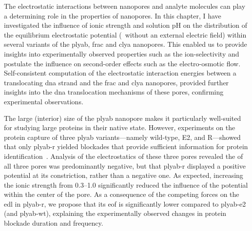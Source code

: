 The electrostatic interactions between nanopores and analyte molecules can play a determining role in the
properties of nanopores. In this chapter, I have investigated the influence of ionic strength and solution pH
on the distribution of the equilibrium electrostatic potential (\ie~without an external electric field) within
several variants of the \gls{plyab}, \gls{frac} and \gls{clya} nanopores. This enabled us to provide insights
into experimentally observed properties such as the ion-selectivity and postulate the influence on second-order
effects such as the electro-osmotic flow. Self-consistent computation of the electrostatic interaction
energies between a translocating \gls{dna} strand and the \gls{frac} and \gls{clya} nanopores, provided
further insights into the \gls{dna} translocation mechanisms of these pores, confirming experimental
observations.

The large (interior) size of the \gls{plyab} nanopore makes it particularly well-suited for studying large
proteins in their native state. However, experiments on the protein capture of three \gls{plyab}
variants---namely wild-type, E2, and R---showed that only \gls{plyab-r} yielded blockades that provide
sufficient information for protein identification~\cite{Huang-2020}. Analysis of the electrostatics of these
three pores revealed the \lumen{} of all three pores was predominantly negative, but that \gls{plyab-r}
displayed a positive potential at its constriction, rather than a negative one. As expected, increasing the
ionic strength from \SIrange{0.3}{1.0}{\Molar} significantly reduced the influence of the potential within the
center of the pore. As a consequence of the competing forces on the \gls{edl} in \gls{plyab-r}, we propose
that its \gls{eof} is significantly lower compared to \gls{plyab-e2} (and \gls{plyab-wt}), explaining the
experimentally observed changes in protein blockade duration and frequency.

